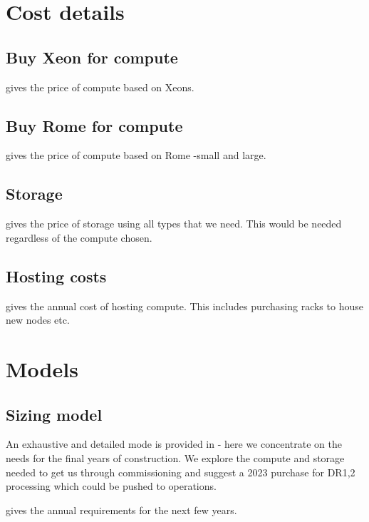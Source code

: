 \section{Cost details}
\subsection{Buy Xeon for compute} \label{sec:xeon}
 gives the price of compute based on Xeons.


\subsection{Buy Rome for compute} \label{sec:rome}
 gives the price of compute based on Rome -small and large.


\subsection{Storage} \label{sec:storagecost}
 gives the price of storage using all  types that we need.
This would be needed regardless of the compute chosen.


\subsection{Hosting costs} \label{sec:overheads}
 gives the annual cost of hosting compute. This includes purchasing racks to house
new nodes etc.


\section{ Models}\label{sec:model}
\subsection{Sizing model}\label{sec:sizemodel}

An exhaustive and detailed mode is provided in   - here we concentrate on the needs for the
final years of construction. We explore the compute and storage needed to get us through commissioning and suggest a 2023 purchase for DR1,2 processing which could be pushed to operations.

 gives the annual requirements for the next few years.



